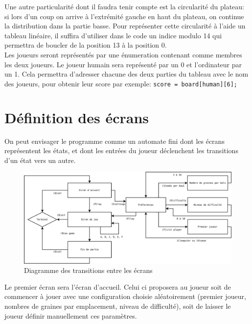\documentclass{article}
\begin{document}
Une autre particularit\'e dont il faudra tenir compte est la circularit\'e du plateau: si lors d'un coup on arrive \`a l'extr\'emit\'e gauche en haut du plateau, on continue la distribution dans la partie basse. Pour repr\'esenter cette circularit\'e \`a l'aide un tableau lin\'eaire, il suffira d'utiliser dans le code un indice modulo 14 qui permettra de boucler de la position 13 \`a la position 0.\\


Les joueurs seront repr\'esent\'es par une \'enumeration contenant comme membres les deux joueurs. Le joueur humain sera repr\'esent\'e par un 0 et l'ordinateur par un 1. Cela permettra d'adresser chacune des deux parties du tableau avec le nom des joueurs, pour obtenir leur score par exemple: \texttt{score = board[human][6];}

\section{D\'efinition des \'ecrans}

On peut envisager le programme comme un automate fini dont les \'ecrans repr\'esentent les \'etats, et dont les entr\'ees du joueur d\'eclenchent les transitions d'un \'etat vers un autre.\\

\begin{figure}[!ht]
  \caption{Diagramme des transitions entre les \'ecrans}
  \centering
\includegraphics[width=1.0\columnwidth]{diagram.png}{} %
\end{figure}

Le premier \'ecran sera l'\'ecran d'accueil. Celui ci proposera au joueur soit de commencer \`a jouer avec une configuration choisie al\'eatoirement (premier joueur, nombres de graines par emplacement, niveau de difficult\'e), soit de laisser le joueur d\'efinir manuellement ces param\`etres.\\
\end{document}
